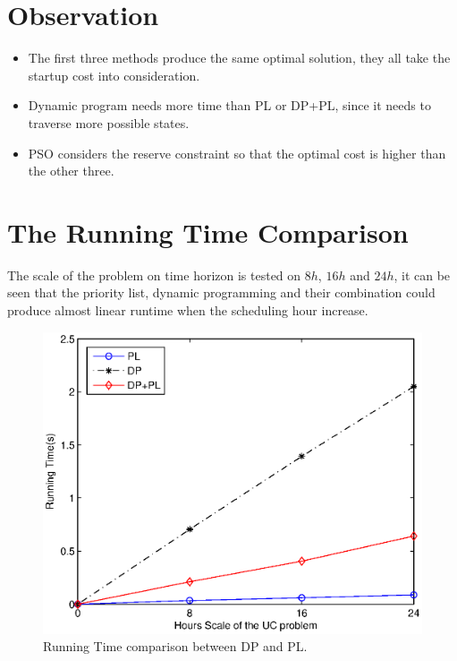 \documentclass[a4paper, 12pt, notitlepage]{report}
\begin{document}
\section{Observation}
\begin{itemize}
  \item The first three methods produce the same optimal solution, they all take the startup cost into consideration.
  \item Dynamic program needs more time than PL or DP+PL, since it needs to traverse more possible states.
  \item PSO considers the reserve constraint so that the optimal cost is higher than the other three.
\end{itemize}


\section{The Running Time Comparison}
The scale of the problem on time horizon is tested on $8h$, $16h$ and $24h$, it can be seen that the priority list, dynamic programming and their combination could produce almost linear runtime when the scheduling hour increase.  
\begin{figure}
\centering
\includegraphics[height=0.6\textwidth]{runtime.eps}
\caption{Running Time comparison between DP and PL.}
\label{Figure1}
\end{figure}

\appendix
\end{document}
